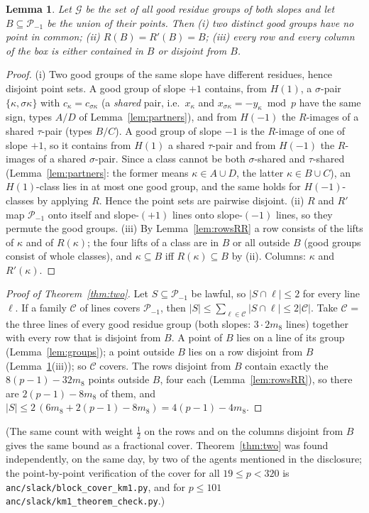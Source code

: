 \documentclass[11pt]{article}
\newtheorem{lemma}[theorem]{Lemma}
\theoremstyle{remark}
\newcommand{\Pset}{\mathcal{P}}
\begin{document}
\begin{lemma}\label{lem:closure}
Let $\mathcal G$ be the set of all good residue groups of both slopes and let $B\subseteq\Pset_{-1}$ be the union of their points.
Then (i) two distinct good groups have no point in common; (ii) $R(B)=R'(B)=B$; (iii) every row and every column of the box is either
contained in $B$ or disjoint from $B$.
\end{lemma}
\begin{proof}
(i) Two good groups of the same slope have different residues, hence disjoint point sets.  A good group of slope $+1$ contains, from
$H(1)$, a $\sigma$-pair $\{\kappa,\sigma\kappa\}$ with $c_\kappa=c_{\sigma\kappa}$ (a \emph{shared} pair, i.e.\ $x_\kappa$ and $x_{\sigma\kappa}=-y_\kappa\bmod p$
have the same sign, types $A/D$ of Lemma~\ref{lem:partners}), and from $H(-1)$ the $R$-images of a shared $\tau$-pair (types $B/C$).
A good group of slope $-1$ is the $R$-image of one of slope $+1$, so it contains from $H(1)$ a shared $\tau$-pair and from $H(-1)$ the
$R$-images of a shared $\sigma$-pair.  Since a class cannot be both $\sigma$-shared and $\tau$-shared (Lemma~\ref{lem:partners}: the former
means $\kappa\in A\cup D$, the latter $\kappa\in B\cup C$), an $H(1)$-class lies in at most one good group, and the same holds for
$H(-1)$-classes by applying $R$.  Hence the point sets are pairwise disjoint.
(ii) $R$ and $R'$ map $\Pset_{-1}$ onto itself and slope-$(+1)$ lines onto slope-$(-1)$ lines, so they permute the good groups.
(iii) By Lemma~\ref{lem:rowsRR} a row consists of the lifts of $\kappa$ and of $R(\kappa)$; the four lifts of a class are in $B$ or all
outside $B$ (good groups consist of whole classes), and $\kappa\subseteq B$ iff $R(\kappa)\subseteq B$ by (ii).  Columns: $\kappa$ and $R'(\kappa)$.
\end{proof}

\begin{proof}[Proof of Theorem~\ref{thm:two}]
Let $S\subseteq\Pset_{-1}$ be lawful, so $|S\cap\ell|\le2$ for every line $\ell$.  If a family $\mathcal C$ of lines covers
$\Pset_{-1}$, then $|S|\le\sum_{\ell\in\mathcal C}|S\cap\ell|\le2|\mathcal C|$.  Take $\mathcal C$ = the three lines of every good residue
group (both slopes: $3\cdot2m_8$ lines) together with every row that is disjoint from $B$.  A point of $B$ lies on a line of its group
(Lemma~\ref{lem:groups}); a point outside $B$ lies on a row disjoint from $B$ (Lemma~\ref{lem:closure}(iii)); so $\mathcal C$ covers.
The rows disjoint from $B$ contain exactly the $8(p-1)-32m_8$ points outside $B$, four each (Lemma~\ref{lem:rowsRR}), so there are
$2(p-1)-8m_8$ of them, and $|S|\le2\,(6m_8+2(p-1)-8m_8)=4(p-1)-4m_8$.
\end{proof}
(The same count with weight $\tfrac12$ on the rows and on the columns disjoint from $B$ gives the same bound as a fractional cover.
Theorem~\ref{thm:two} was found independently, on the same day, by two of the agents mentioned in the disclosure; the point-by-point
verification of the cover for all $19\le p<320$ is \texttt{anc/slack/block\_cover\_km1.py}, and for $p\le101$ \texttt{anc/slack/km1\_theorem\_check.py}.)
\end{document}
